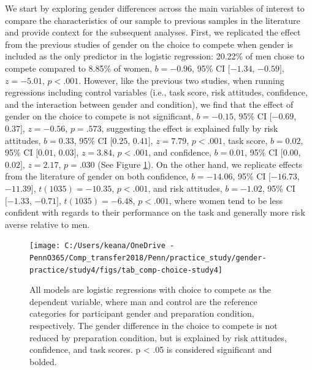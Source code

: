 \documentclass[a4paper, nobind]{templates/ociamthesis}
\begin{document}
We start by exploring gender differences across the main variables of interest to compare the characteristics of our sample to previous samples in the literature and provide context for the subsequent analyses. First, we replicated the effect from the previous studies of gender on the choice to compete when gender is included as the only predictor in the logistic regression: 20.22\% of men chose to compete compared to 8.85\% of women, \(b = -0.96\), 95\% CI \([-1.34\), \(-0.59]\), \(z = -5.01\), \(p < .001\). However, like the previous two studies, when running regressions including control variables (i.e., task score, risk attitudes, confidence, and the interaction between gender and condition), we find that the effect of gender on the choice to compete is not significant, \(b = -0.15\), 95\% CI \([-0.69\), \(0.37]\), \(z = -0.56\), \(p = .573\), suggesting the effect is explained fully by risk attitudes, \(b = 0.33\), 95\% CI \([0.25\), \(0.41]\), \(z = 7.79\), \(p < .001\), task score, \(b = 0.02\), 95\% CI \([0.01\), \(0.03]\), \(z = 3.84\), \(p < .001\), and confidence, \(b = 0.01\), 95\% CI \([0.00\), \(0.02]\), \(z = 2.17\), \(p = .030\) (See Figure \ref{fig:tab-comp-choice-study4}). On the other hand, we replicate effects from the literature of gender on both confidence, \(b = -14.06\), 95\% CI \([-16.73\), \(-11.39]\), \(t(1035) = -10.35\), \(p < .001\), and risk attitudes, \(b = -1.02\), 95\% CI \([-1.33\), \(-0.71]\), \(t(1035) = -6.48\), \(p < .001\), where women tend to be less confident with regards to their performance on the task and generally more risk averse relative to men.

\begin{figure}

{\centering \texttt{[image: C:/Users/keana/OneDrive - PennO365/Comp\_transfer2018/Penn/practice\_study/gender-practice/study4/figs/tab\_comp-choice-study4]} 

}

\caption{All models are logistic regressions with choice to compete as the dependent variable, where man and control are the reference categories for participant gender and preparation condition, respectively. The gender difference in the choice to compete is not reduced by preparation condition, but is explained by risk attitudes, confidence, and task scores. p < .05 is considered significant and bolded.}\label{fig:tab-comp-choice-study4}
\end{figure}
\end{document}
